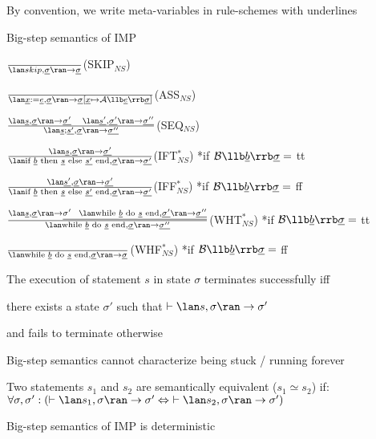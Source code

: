 		\item By convention, we write meta-variables in rule-schemes with underlines
	\enumend
	\item Big-step semantics of IMP
	\enumstart
		\item $\frac{}{\lan skip, \underline{\sigma} \ran \rightarrow \underline{\sigma}}$(SKIP$_{NS}$)
		\item $\frac{}{\lan \underline{x} := \underline{e}, \underline{\sigma} \ran \rightarrow \underline{\sigma}[\underline{x} \mapsto \mathcal{A}\llb \underline{e}\rrb\underline{\sigma}]}$(ASS$_{NS}$)
		\item $\frac{\lan \underline{s}, \underline{\sigma} \ran \rightarrow \underline{\sigma'} \ \ \ \lan \underline{s'}, \underline{\sigma'}\ran \rightarrow \underline{\sigma''}}{\lan \underline{s}; \underline{s'}, \underline{\sigma}\ran \rightarrow \underline{\sigma''}}$(SEQ$_{NS}$)
		\item $\frac{\lan \underline{s}, \underline{\sigma} \ran \rightarrow \underline{\sigma'}}{\lan \text{if }\underline{b} \text{ then }\underline{s}\text{ else } \underline{s'}\text{ end}, \underline{\sigma}\ran \rightarrow \underline{\sigma'}}$(IFT$^*_{NS}$) *if $\mathcal{B}\llb \underline{b} \rrb \underline{\sigma} =$ tt
		\item $\frac{\lan \underline{s'}, \underline{\sigma} \ran \rightarrow \underline{\sigma'}}{\lan \text{if }\underline{b} \text{ then }\underline{s}\text{ else } \underline{s'}\text{ end}, \underline{\sigma}\ran \rightarrow \underline{\sigma'}}$(IFF$^*_{NS}$) *if $\mathcal{B}\llb \underline{b} \rrb \underline{\sigma} =$ ff
		\item $\frac{\lan \underline{s}, \underline{\sigma} \ran \rightarrow \underline{\sigma' \ \ \lan \text{while } \underline{b} \text{ do } \underline{s} \text{ end}, \underline{\sigma'}\ran \rightarrow \underline{\sigma''}}}{\lan \text{while } \underline{b} \text{ do } \underline{s} \text{ end}, \underline{\sigma} \ran \rightarrow \underline{\sigma''}}$(WHT$^*_{NS}$) *if $\mathcal{B}\llb \underline{b} \rrb \underline{\sigma} =$ tt
		\item $\frac{}{\lan \text{while } \underline{b} \text{ do } \underline{s} \text{ end}, \underline{\sigma} \ran \rightarrow \underline{\sigma}}$(WHF$^*_{NS}$) *if $\mathcal{B}\llb \underline{b} \rrb \underline{\sigma} =$ ff
	\enumend
	\item The execution of statement $s$ in state $\sigma$ terminates successfully iff
	\enumstart
		\item there exists a state $\sigma'$ such that $\vdash \lan s, \sigma \ran \rightarrow \sigma'$
		\item and fails to terminate otherwise
	\enumend
	\item Big-step semantics cannot characterize being stuck / running forever
	\item Two statements $s_1$ and $s_2$ are semantically equivalent ($s_1 \simeq s_2$) if: $\forall \sigma, \sigma': (\vdash \lan s_1, \sigma \ran \rightarrow \sigma' \Leftrightarrow \ \vdash \lan s_2, \sigma \ran \rightarrow \sigma')$
	\item Big-step semantics of IMP is deterministic
\enumend

